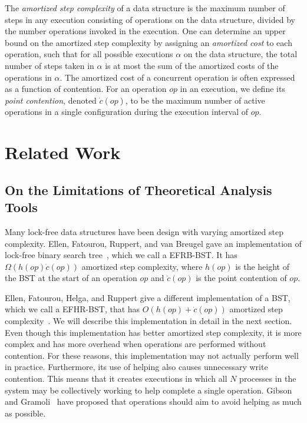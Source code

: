 \documentclass[letterpaper]{article}
\begin{document}
The \textit{amortized step complexity} of a data structure is the maximum number of steps in any execution consisting of operations on the data structure, divided by the number operations invoked in the execution. One can determine an upper bound on the amortized step complexity by assigning an \textit{amortized cost} to each operation, such that for all possible executions $\alpha$ on the data structure, the total number of steps taken in $\alpha$ is at most the sum of the amortized costs of the operations in $\alpha$. The amortized cost of a concurrent operation is often expressed as a function of contention. For an operation $op$ in an execution, we define its \textit{point contention}, denoted $\dot{c}(op)$, to be the maximum number of active operations in a single configuration during the execution interval of $op$. 

\section{Related Work}\label{section_related}

\subsection{On the Limitations of Theoretical Analysis Tools}
Many lock-free data structures have been design with varying amortized step complexity. Ellen, Fatourou, Ruppert, and van Breugel gave an implementation of lock-free binary search tree~\cite{EllenFRB10}, which we call a EFRB-BST. It has $\Omega(h(op)\dot{c}(op))$ amortized step complexity, where $h(op)$ is the height of the BST at the start of an operation $op$ and $\dot{c}(op)$ is the point contention of $op$. 

Ellen, Fatourou, Helga, and Ruppert give a different implementation of a BST, which we call a EFHR-BST, that has $O(h(op) + \dot{c}(op))$ amortized step complexity~\cite{EllenFHR13}. We will describe this implementation in detail in the next section. Even though this implementation has better amortized step complexity, it is more complex and has more overhead when operations are performed without contention. For these reasons, this implementation may not actually perform well in practice. Furthermore, its use of helping also causes unnecessary write contention. This means that it creates executions in which all $N$ processes in the system may be collectively working to help complete a single operation. Gibson and Gramoli~\cite{GibsonG15} have proposed that operations should aim to avoid helping as much as possible. 
\end{document}
